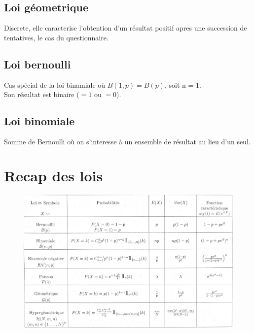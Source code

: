 \documentclass[11pt]{article}
\newcommand{\squeezeup}{\vspace{-4.5cm}}
\begin{document}
\subsection{Loi géometrique}
Discrete, elle caracterise l'obtention d'un résultat positif apres une succession de tentatives, le cas du questionnaire.

\subsection{Loi bernoulli}
Cas spécial de la loi binamiale où $B(1,p) = B(p)$, soit n = 1.\\ 
Son résultat est binaire ($=1$ ou $=0$).

\subsection{Loi binomiale}
Somme de Bernoulli où on s'interesse à un ensemble de résultat au lieu d'un seul.

\pagebreak
\section{Recap des lois}
\begin{figure}[h!]
    \centering
    \includegraphics[scale=0.7]{img/recap.pdf}
\end{figure}
\end{document}
